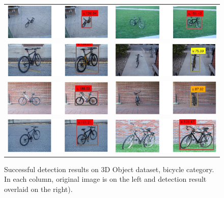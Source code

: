 \documentclass[10pt,twocolumn,letterpaper]{article}
\begin{document}
\begin{figure}[h]
\setlength\tabcolsep{1pt}
\centering
\begin{tabular}{|c|c|}
  \hline
  \includegraphics[width=0.40\linewidth]{supp/bicycle17.png} &
  \includegraphics[width=0.40\linewidth]{supp/bicycle18.png} \\
  \includegraphics[width=0.40\linewidth]{supp/bicycle13.png} &
  \includegraphics[width=0.40\linewidth]{supp/bicycle9.png} \\
  \includegraphics[width=0.40\linewidth]{supp/bicycle16.png} &
  \includegraphics[width=0.40\linewidth]{supp/bicycle12.png} \\
  \includegraphics[width=0.40\linewidth]{supp/bicycle15.png} &
  \includegraphics[width=0.40\linewidth]{supp/bicycle10.png} \\
  \hline
  \end{tabular}
\caption{Successful detection results on 3D Object dataset, bicycle
category. In each column, original image is on the left and detection result overlaid on
the right).}%
  \label{fig:3dobject_bicycle_good}
\end{figure}
\end{document}
